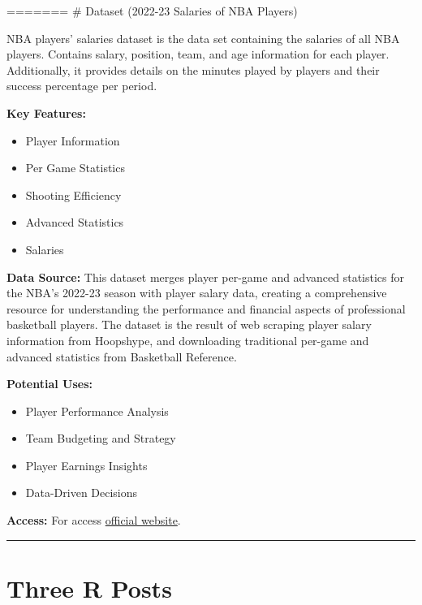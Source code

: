 \documentclass[
  letterpaper,
  DIV=11,
  numbers=noendperiod]{scrreprt}
\begin{document}
======= \# \textbar{} Dataset (2022-23 Salaries of NBA Players)

NBA players' salaries dataset is the data set containing the salaries of
all NBA players. Contains salary, position, team, and age information
for each player. Additionally, it provides details on the minutes played
by players and their success percentage per period.

\textbf{Key Features:}

\begin{itemize}
\item
  Player Information
\item
  Per Game Statistics
\item
  Shooting Efficiency
\item
  Advanced Statistics
\item
  Salaries
\end{itemize}

\textbf{Data Source:} This dataset merges player per-game and advanced
statistics for the NBA's 2022-23 season with player salary data,
creating a comprehensive resource for understanding the performance and
financial aspects of professional basketball players. The dataset is the
result of web scraping player salary information from Hoopshype, and
downloading traditional per-game and advanced statistics from Basketball
Reference.

\textbf{Potential Uses:}

\begin{itemize}
\item
  Player Performance Analysis
\item
  Team Budgeting and Strategy
\item
  Player Earnings Insights
\item
  Data-Driven Decisions
\end{itemize}

\textbf{Access:} For access
\href{https://www.kaggle.com/datasets/jamiewelsh2/nba-player-salaries-2022-23-season/data}{official
website}.

\begin{center}\rule{0.5\linewidth}{0.5pt}\end{center}


\hypertarget{three-r-posts}{%
\chapter{\textbar{} Three R Posts}\label{three-r-posts}}
\end{document}
